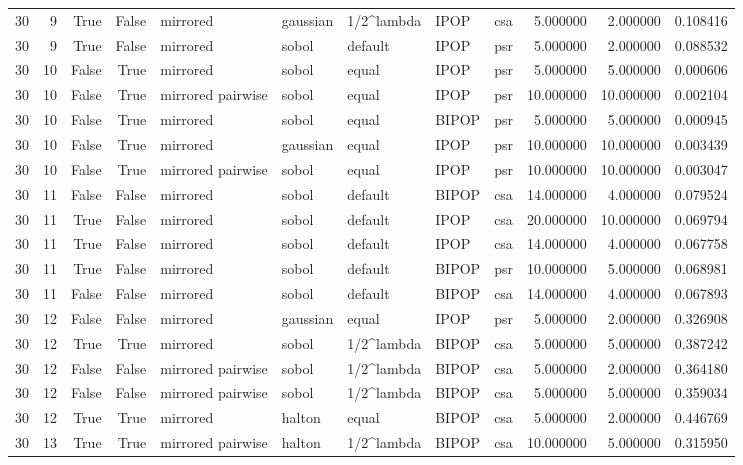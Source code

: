 \begin{tabular}{rrrrlllllrrr}
30 & 9 & True & False & mirrored & gaussian & 1/2^lambda & IPOP & csa & 5.000000 & 2.000000 & 0.108416 \\
30 & 9 & True & False & mirrored & sobol & default & IPOP & psr & 5.000000 & 2.000000 & 0.088532 \\
30 & 10 & False & True & mirrored & sobol & equal & IPOP & psr & 5.000000 & 5.000000 & 0.000606 \\
30 & 10 & False & True & mirrored pairwise & sobol & equal & IPOP & psr & 10.000000 & 10.000000 & 0.002104 \\
30 & 10 & False & True & mirrored & sobol & equal & BIPOP & psr & 5.000000 & 5.000000 & 0.000945 \\
30 & 10 & False & True & mirrored & gaussian & equal & IPOP & psr & 10.000000 & 10.000000 & 0.003439 \\
30 & 10 & False & True & mirrored pairwise & sobol & equal & IPOP & psr & 10.000000 & 10.000000 & 0.003047 \\
30 & 11 & False & False & mirrored & sobol & default & BIPOP & csa & 14.000000 & 4.000000 & 0.079524 \\
30 & 11 & True & False & mirrored & sobol & default & IPOP & csa & 20.000000 & 10.000000 & 0.069794 \\
30 & 11 & True & False & mirrored & sobol & default & IPOP & csa & 14.000000 & 4.000000 & 0.067758 \\
30 & 11 & True & False & mirrored & sobol & default & BIPOP & psr & 10.000000 & 5.000000 & 0.068981 \\
30 & 11 & False & False & mirrored & sobol & default & BIPOP & csa & 14.000000 & 4.000000 & 0.067893 \\
30 & 12 & False & False & mirrored & gaussian & equal & IPOP & psr & 5.000000 & 2.000000 & 0.326908 \\
30 & 12 & True & True & mirrored & sobol & 1/2^lambda & BIPOP & csa & 5.000000 & 5.000000 & 0.387242 \\
30 & 12 & False & False & mirrored pairwise & sobol & 1/2^lambda & BIPOP & csa & 5.000000 & 2.000000 & 0.364180 \\
30 & 12 & False & False & mirrored pairwise & sobol & 1/2^lambda & BIPOP & csa & 5.000000 & 5.000000 & 0.359034 \\
30 & 12 & True & True & mirrored & halton & equal & BIPOP & csa & 5.000000 & 2.000000 & 0.446769 \\
30 & 13 & True & True & mirrored pairwise & halton & 1/2^lambda & BIPOP & csa & 10.000000 & 5.000000 & 0.315950 \\

\end{tabular}
